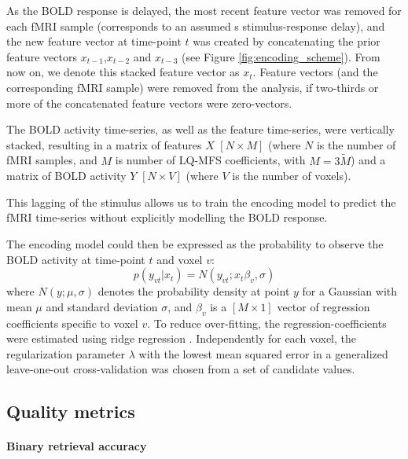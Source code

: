 As the BOLD response is delayed,  the most recent feature vector was removed
for each f{MRI} sample (corresponds to an assumed \unit[2]{s} stimulus-response delay), and the new feature vector at time-point $t$ was created by
concatenating the prior feature vectors $x_{t-1}$,$x_{t-2}$ and $x_{t-3}$
(see Figure \ref{fig:encoding_scheme}). From
now on, we denote this stacked feature vector as $x_{t}$.
Feature vectors (and the corresponding f{MRI} sample) were removed from the
analysis, if two-thirds or more of the concatenated feature vectors were
zero-vectors.

The BOLD activity time-series, as well as the feature time-series, were
vertically stacked, resulting in a matrix of features $X$ $[N\times M]$ (where $N$ is
the number of f{MRI} samples, and $M$ is number of LQ-MFS coefficients, with
$M=3\widetilde{M}$) and a matrix of BOLD activity $Y$ $[N\times V]$ (where $V$ is
the number of voxels).

This lagging of the stimulus allows us to train the encoding model to predict
the f{MRI} time-series without explicitly modelling the BOLD response.

The encoding model could then be expressed as the probability to observe the BOLD activity at time-point $t$ and voxel $v$:
%
\begin{equation}
  \label{eq:encmo}
  p(y_{vt}|x_{t}) = N(y_{vt};x_{t}\beta_{v},\sigma)
\end{equation}
%
where $N(y;\mu,\sigma)$ denotes the probability density at point $y$ for a
Gaussian with mean $\mu$ and standard deviation $\sigma$, and $\beta_{v}$ is a
$[M\times1]$ vector of regression coefficients specific to voxel $v$. To reduce
over-fitting, the regression-coefficients were estimated using ridge regression
\citep{HK70}.  Independently for each voxel, the regularization parameter
$\lambda$ with the lowest mean squared error in a generalized leave-one-out
cross-validation \citep{GHW79} was chosen from a set of candidate values.

\subsection*{Quality metrics} 

\paragraph{Binary retrieval accuracy}

